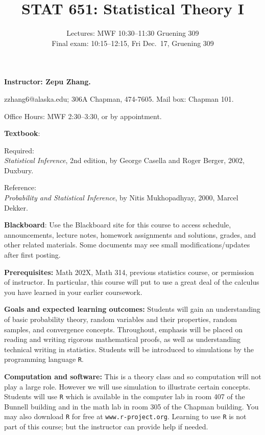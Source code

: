 \documentclass{article}
\begin{document}
\title{STAT 651: Statistical Theory I}
\author{Lectures: MWF 10:30--11:30 Gruening 309\\
Final exam: 10:15--12:15, Fri Dec.~17, Gruening 309}
\date{}
\maketitle

\textbf{\large Instructor: Zepu Zhang.}

zzhang6@alaska.edu;
306A Chapman, 474-7605.
Mail box: Chapman 101.

Office Hours: MWF 2:30--3:30,
or by appointment.

\bigskip
\textbf{\large Textbook}:

Required:\\
\textit{Statistical Inference}, 2nd edition,
by George Casella and Roger Berger,
2002, Duxbury.

Reference:\\
\textit{Probability and Statistical Inference},
by Nitis Mukhopadhyay, 2000, Marcel Dekker.

\bigskip
\textbf{\large Blackboard}:
Use the Blackboard site for this course to access
schedule, announcements, lecture notes, homework assignments and
solutions, grades, and other related materials.
Some documents may see small modifications/updates after first posting.

\bigskip
\textbf{\large Prerequisites:}
Math 202X, Math 314, previous statistics course, or permission of
instructor. In particular, this course will put to use a great deal of
the calculus you have learned in your earlier coursework.

\bigskip
\textbf{\large Goals and expected learning outcomes:}
Students will gain an understanding of basic probability theory, random
variables and their properties, random samples, and convergence
concepts. Throughout, emphasis will be placed on reading and writing
rigorous mathematical proofs, as well as understanding technical writing
in statistics. Students will be introduced to simulations by the
programming language \texttt{R}.

\bigskip
\textbf{\large Computation and software:}
This is a theory class and so computation will not play a large role.
However we will use simulation to illustrate certain concepts.
Students will use \texttt{R} which is available in the computer lab in
room 407 of the Bunnell building and in the math lab in room 305 of the
Chapman building.
You may also download \texttt{R} for free at \texttt{www.r-project.org}.
Learning to use \texttt{R} is not part of this course;
but the instructor can provide help if needed.
\end{document}
